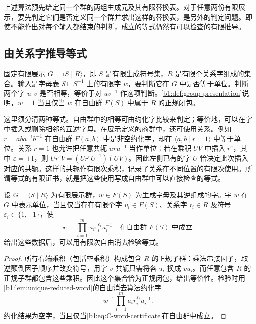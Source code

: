 上述算法预先给定同一个群的两组生成元及其有限替换表。对于任意两份有限展示，要先判定它们是否定义同一个群并求出这样的替换表，是另外的判定问题。即使不能作出对每个输入都结束的判断，成立的等式仍然有可以检查的有限推导。

\subsection{由关系字推导等式}
\label{b1:subsec:C03:01}

固定有限展示 \(G=\langle S\mid R\rangle\)，即 \(S\) 是有限生成符号集，\(R\) 是有限个关系字组成的集合。输入是字母表 \(S\sqcup S^{-1}\) 上的有限字 \(w\)，要判断它在 \(G\) 中是否等于单位。判断两个字 \(u,v\) 是否相等，等价于对 \(uv^{-1}\) 作这项判断。\cref{b1:def:group-presentation}说明，\(w=1\) 当且仅当 \(w\) 在自由群 \(F(S)\) 中属于 \(R\) 的正规闭包。

\ProseParagraphBreak
这里须分清两种等式。自由群中的相等可由约化字比较来判定；等价地，可以在字中插入或删除相邻的互逆字母。在展示定义的商群中，还可使用关系。例如 \(r=aba^{-1}b^{-1}\) 在自由群 \(F(a,b)\) 中是非空约化字，却在 \(\langle a,b\mid r=1\rangle\) 中等于单位。关系 \(r=1\) 也允许把任意共轭 \(uru^{-1}\) 当作单位；若在乘积 \(UV\) 中插入 \(r^\varepsilon\)，其中 \(\varepsilon=\pm1\)，则 \(Ur^\varepsilon V=(Ur^\varepsilon U^{-1})(UV)\)。因此左侧已有的字 \(U\) 恰决定此次插入对应的共轭。这样的共轭作有限次乘积，记录了关系在不同位置的有限次使用。所谓等式的有限证书，就是把这些使用写成自由群中可以直接检查的等式。

\begin{proposition}\label{b1:prop:C-word-certificate}
	设 \(G=\langle S\mid R\rangle\) 为有限展示群，\(w\in F(S)\) 为生成字母及其逆组成的字。字 \(w\) 在 \(G\) 中表示单位，当且仅当存在有限个字 \(u_i\in F(S)\)、关系字 \(r_i\in R\) 及符号 \(\varepsilon_i\in\{1,-1\}\)，使
	\begin{equation}\label{b1:eq:C-word-certificate}
		w=\prod_{i=1}^m u_i r_i^{\varepsilon_i}u_i^{-1} \quad\text{在自由群}\;F(S)\;\text{中成立}.
	\end{equation}
	给出这些数据后，可以用有限次自由消去检验等式。
\end{proposition}

\begin{proof}
	所有右端乘积（包括空乘积）构成包含 \(R\) 的正规子群：乘法串接因子，取逆颠倒因子顺序并改变符号，用字 \(v\) 共轭只需将各 \(u_i\) 换成 \(vu_i\)。而任意包含 \(R\) 的正规子群都包含这些乘积。因此这个集合恰为正规闭包，给出等价性。检验时用\cref{b1:lem:unique-reduced-word}的自由消去算法约化字
	\[
		w^{-1}\prod_{i=1}^m u_i r_i^{\varepsilon_i}u_i^{-1}.
	\]
	约化结果为空字，当且仅当\eqref{b1:eq:C-word-certificate}在自由群中成立。
\end{proof}

